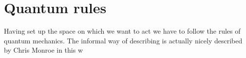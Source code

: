 \section{Quantum rules}
Having set up the space on which we want to act we have to follow the rules of quantum mechanics. The informal way of describing is actually nicely described by Chris Monroe in this w